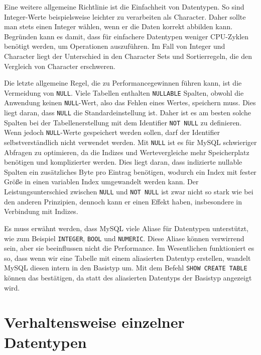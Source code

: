 Eine weitere allgemeine Richtlinie ist die Einfachheit von Datentypen.
So sind Integer-Werte beispielsweise leichter zu verarbeiten als Character.
Daher sollte man stets einen Integer wählen, wenn er die Daten korrekt abbilden kann.
Begründen kann es damit, dass für einfachere Datentypen weniger CPU-Zyklen benötigt werden, um Operationen auszuführen.
Im Fall von Integer und Character liegt der Unterschied in den Character Sets und Sortierregeln, die den Vergleich von Character erschweren.

Die letzte allgemeine Regel, die zu Performancegewinnen führen kann, ist die Vermeidung von \texttt{NULL}.
Viele Tabellen enthalten \texttt{NULLABLE} Spalten, obwohl die Anwendung keinen \texttt{NULL}-Wert, also das Fehlen eines Wertes, speichern muss.
Dies liegt daran, dass \texttt{NULL} die Standardeinstellung ist.
Daher ist es am besten solche Spalten bei der Tabellenerstellung mit dem Identifier \texttt{NOT NULL} zu definieren.
Wenn jedoch \texttt{NULL}-Werte gespeichert werden sollen, darf der Identifier selbstverständlich nicht verwendet werden.
Mit \texttt{NULL} ist es für MySQL schwieriger Abfragen zu optimieren, da die Indizes und Wertevergleiche mehr Speicherplatz benötigen und komplizierter werden.
Dies liegt daran, dass indizierte nullable Spalten ein zusätzliches Byte pro Eintrag benötigen, wodurch ein Index mit fester Größe in einen variablen Index umgewandelt werden kann.
Der Leistungsunterschied zwischen \texttt{NULL} und \texttt{NOT NULL} ist zwar nicht so stark wie bei den anderen Prinzipien, dennoch kann er einen Effekt haben, insbesondere in Verbindung mit Indizes.

Es muss erwähnt werden, dass MySQL viele Aliase für Datentypen unterstützt, wie zum Beispiel \texttt{INTEGER}, \texttt{BOOL} und \texttt{NUMERIC}.
Diese Aliase können verwirrend sein, aber sie beeinflussen nicht die Performance.
Im Wesentlichen funktioniert es so, dass wenn wir eine Tabelle mit einem aliasierten Datentyp erstellen, wandelt MySQL diesen intern in den Basistyp um.
Mit dem Befehl \texttt{SHOW CREATE TABLE} können das bestätigen, da statt des aliasierten Datentyps der Basistyp angezeigt wird.

\section{Verhaltensweise einzelner Datentypen}\label{sec:data-types-verhaltensweise-einzelner-datentypen}

